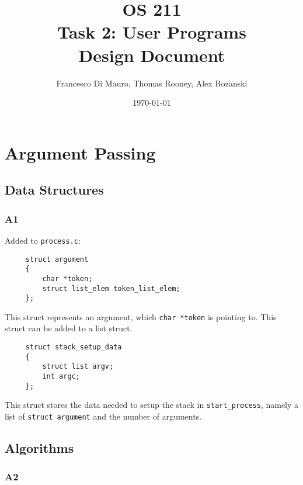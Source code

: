 \documentclass[a4wide, 11pt]{article}
\newcommand{\tab}{\hspace*{2em}}
\newcommand{\tx}{\texttt}
\begin{document}
\title{OS 211 \\ Task 2: User Programs \\ Design Document}
\author{Francesco Di Mauro, Thomas Rooney, Alex Rozanski}
\date{\today}
\maketitle

\section{Argument Passing}
\subsection{Data Structures}
\subsubsection{A1}
Added to \tx{process.c}:
\tab \begin{verbatim}
     struct argument
     {
         char *token;
         struct list_elem token_list_elem;
     };
\end{verbatim}
This struct represents an argument, which \tx{char *token} is pointing to. This struct can be added to a list struct.
\\
\tab \begin{verbatim}
     struct stack_setup_data
     {
         struct list argv;
         int argc;
     };
\end{verbatim}
This struct stores the data needed to setup the stack in \tx{start\_process}, namely a list of \tx{struct argument} and the number of arguments. 

\subsection{Algorithms}
\subsubsection{A2}
\end{document}
